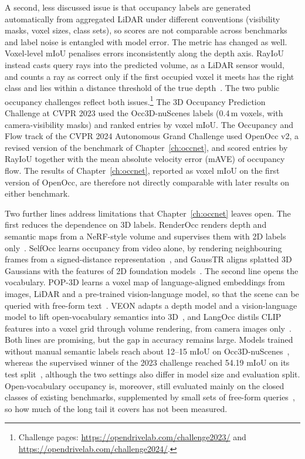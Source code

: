 A second, less discussed issue is that occupancy labels are generated automatically from aggregated LiDAR under different conventions (visibility masks, voxel sizes, class sets), so scores are not comparable across benchmarks and label noise is entangled with model error. The metric has changed as well. Voxel-level mIoU penalises errors inconsistently along the depth axis. RayIoU instead casts query rays into the predicted volume, as a LiDAR sensor would, and counts a ray as correct only if the first occupied voxel it meets has the right class and lies within a distance threshold of the true depth~\cite{liu2024sparseocc}. The two public occupancy challenges reflect both issues.\footnote{Challenge pages: \url{https://opendrivelab.com/challenge2023/} and \url{https://opendrivelab.com/challenge2024/}.} The 3D Occupancy Prediction Challenge at CVPR 2023 used the Occ3D-nuScenes labels (0.4\,m voxels, with camera-visibility masks) and ranked entries by voxel mIoU. The Occupancy and Flow track of the CVPR 2024 Autonomous Grand Challenge used OpenOcc v2, a revised version of the benchmark of Chapter~\ref{ch:occnet}, and scored entries by RayIoU together with the mean absolute velocity error (mAVE) of occupancy flow. The results of Chapter~\ref{ch:occnet}, reported as voxel mIoU on the first version of OpenOcc, are therefore not directly comparable with later results on either benchmark.

Two further lines address limitations that Chapter~\ref{ch:occnet} leaves open. The first reduces the dependence on 3D labels. RenderOcc renders depth and semantic maps from a NeRF-style volume and supervises them with 2D labels only~\cite{pan2024renderocc}. SelfOcc learns occupancy from video alone, by rendering neighbouring frames from a signed-distance representation~\cite{huang2024selfocc}, and GaussTR aligns splatted 3D Gaussians with the features of 2D foundation models~\cite{jiang2025gausstr}. The second line opens the vocabulary. POP-3D learns a voxel map of language-aligned embeddings from images, LiDAR and a pre-trained vision-language model, so that the scene can be queried with free-form text~\cite{vobecky2023pop3d}. VEON adapts a depth model and a vision-language model to lift open-vocabulary semantics into 3D~\cite{zheng2024veon}, and LangOcc distils CLIP features into a voxel grid through volume rendering, from camera images only~\cite{boeder2025langocc}. Both lines are promising, but the gap in accuracy remains large. Models trained without manual semantic labels reach about 12--15 mIoU on Occ3D-nuScenes~\cite{jiang2025gausstr,zheng2024veon}, whereas the supervised winner of the 2023 challenge reached 54.19 mIoU on its test split~\cite{li2023fbocc}, although the two settings also differ in model size and evaluation split. Open-vocabulary occupancy is, moreover, still evaluated mainly on the closed classes of existing benchmarks, supplemented by small sets of free-form queries~\cite{vobecky2023pop3d}, so how much of the long tail it covers has not been measured.

